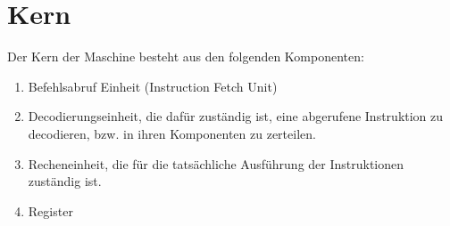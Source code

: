 \section{Kern}
\label{sec:Kern}

Der Kern der Maschine besteht aus den folgenden Komponenten:

\begin{enumerate}
  \item Befehlsabruf Einheit (Instruction Fetch Unit)
  \item Decodierungseinheit, die dafür zuständig ist, eine abgerufene
   Instruktion zu decodieren, bzw. in ihren Komponenten zu zerteilen.
  \item Recheneinheit, die für die tatsächliche Ausführung der Instruktionen
   zuständig ist. 
  \item Register
\end{enumerate}
